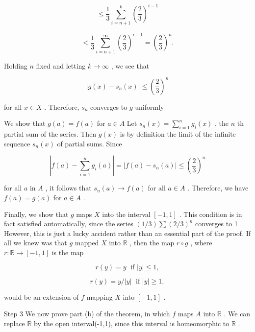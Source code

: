 \[
\leq  \frac{1}{3}\mathop{\sum }\limits_{{i = n + 1}}^{k}{\left( \frac{2}{3}\right) }^{i - 1}
\]

\[
< \frac{1}{3}\mathop{\sum }\limits_{{i = n + 1}}^{\infty }{\left( \frac{2}{3}\right) }^{i - 1} = {\left( \frac{2}{3}\right) }^{n}.
\]

Holding \(n\) fixed and letting \(k \rightarrow  \infty\) , we see that

\[
\left| {g\left( x\right)  - {s}_{n}\left( x\right) }\right|  \leq  {\left( \frac{2}{3}\right) }^{n}
\]

for all \(x \in  X\) . Therefore, \({s}_{n}\) converges to \(g\) uniformly

We show that \(g\left( a\right)  = f\left( a\right)\) for \(a \in  A\) Let \({s}_{n}\left( x\right)  = \mathop{\sum }\limits_{{i = 1}}^{n}{g}_{i}\left( x\right)\) , the \(n\) th partial sum of the series. Then \(g\left( x\right)\) is by definition the limit of the infinite sequence \({s}_{n}\left( x\right)\) of partial sums. Since

\[
\left| {f\left( a\right)  - \mathop{\sum }\limits_{{i = 1}}^{n}{g}_{i}\left( a\right) }\right|  = \left| {f\left( a\right)  - {s}_{n}\left( a\right) }\right|  \leq  {\left( \frac{2}{3}\right) }^{n}
\]

for all \(a\) in \(A\) , it follows that \({s}_{n}\left( a\right)  \rightarrow  f\left( a\right)\) for all \(a \in  A\) . Therefore, we have \(f\left( a\right)  = g\left( a\right)\) for \(a \in  A\) .

Finally, we show that \(g\) maps \(X\) into the interval \(\left\lbrack  {-1,1}\right\rbrack\) . This condition is in fact satisfied automatically, since the series \(\left( {1/3}\right) \sum {\left( 2/3\right) }^{n}\) converges to 1 . However, this is just a lucky accident rather than an essential part of the proof. If all we knew was that \(g\) mapped \(X\) into \(\mathbb{R}\) , then the map \(r \circ  g\) , where \(r : \mathbb{R} \rightarrow  \left\lbrack  {-1,1}\right\rbrack\) is the map

\[
r\left( y\right)  = y\;\text{ if }\left| y\right|  \leq  1,
\]

\[
r\left( y\right)  = y/\left| y\right| \;\text{ if }\left| y\right|  \geq  1,
\]

would be an extension of \(f\) mapping \(X\) into \(\left\lbrack  {-1,1}\right\rbrack\) .

Step 3 We now prove part (b) of the theorem, in which \(f\) maps \(A\) into \(\mathbb{R}\) . We can replace \(\mathbb{R}\) by the open interval(-1,1), since this interval is homeomorphic to \(\mathbb{R}\) .

